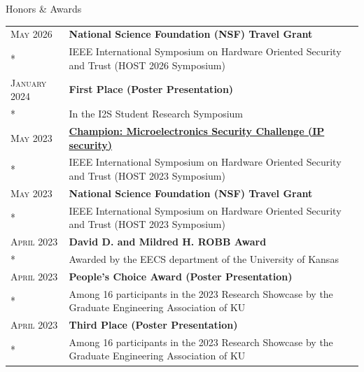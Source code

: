 \begin{rSection}{Honors \& Awards}

\setlength{\LTleft}{0pt}
\setlength{\LTright}{\fill}
\setlength{\LTpre}{0pt}
\setlength{\LTpost}{0pt}
\begin{longtable}{lp{15.9cm}}
    \textsc{May 2026} & \textbf{National Science Foundation (NSF) Travel Grant} \\*
                      & IEEE International Symposium on Hardware Oriented Security and Trust (HOST 2026 Symposium) \\

    \textsc{January 2024} & \textbf{First Place (Poster Presentation)} \\*
                         & In the I2S Student Research Symposium \\
    \textsc{May 2023} & \href{http://www.hostsymposium.org/host_2023awards.php}{\textbf{Champion: Microelectronics Security Challenge (IP security)}} \\*
                      & IEEE International Symposium on Hardware Oriented Security and Trust (HOST 2023 Symposium) \\

    \textsc{May 2023} & \textbf{National Science Foundation (NSF) Travel Grant} \\*
                      & IEEE International Symposium on Hardware Oriented Security and Trust (HOST 2023 Symposium) \\

    \textsc{April 2023} & \textbf{David D. and Mildred H. ROBB Award} \\*
                         & Awarded by the EECS department of the University of Kansas \\

    \textsc{April 2023} & \textbf{People's Choice Award (Poster Presentation)} \\*
                         & Among 16 participants in the 2023 Research Showcase by the Graduate Engineering Association of KU \\

    \textsc{April 2023} & \textbf{Third Place (Poster Presentation)} \\*
                         & Among 16 participants in the 2023 Research Showcase by the Graduate Engineering Association of KU \\


\end{longtable}
\end{rSection}
